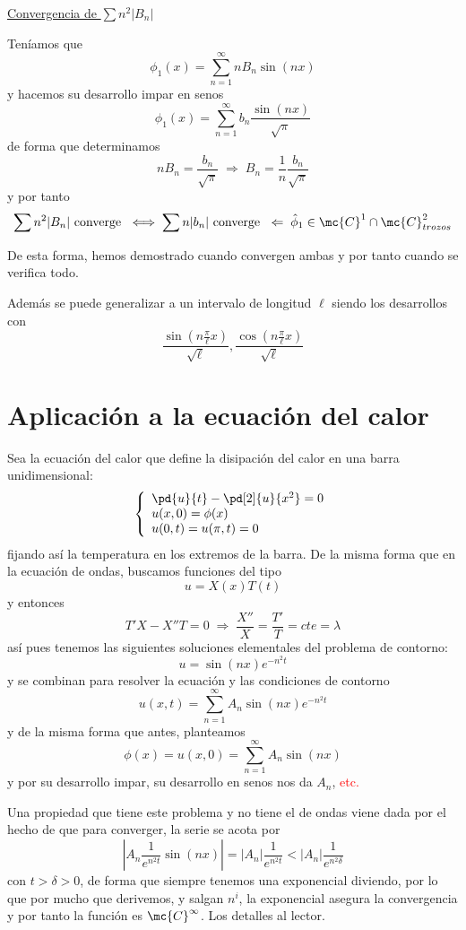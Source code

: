 \begin{eje}
     \underline{Convergencia de $\sum n^2 |B_n|$}

    Teníamos que
    $$\phi_1(x)=\sum_{n=1}^{\infty} n B_n \sin(nx)$$
    y hacemos su desarrollo impar en senos
    $$\hat{\phi}_1(x)=\sum_{n=1}^{\infty} b_n \dfrac{\sin(nx)}{\sqrt{\pi}}$$
    de forma que determinamos
    $$nB_n=\dfrac{b_n}{\sqrt{\pi}} \; \Rightarrow \; B_n =\dfrac{1}{n} \dfrac{b_n}{\sqrt{\pi}}$$
    y por tanto
    $$\sum n^2|B_n| \text{ converge } \iff \sum n |b_n| \text{ converge }\; \Leftarrow \; \hat{\phi}_1 \in \mc{C}^1 \cap \mc{C}^2_{trozos}$$

    De esta forma, hemos demostrado cuando convergen ambas y por tanto cuando se verifica todo.

    Además se puede generalizar a un intervalo de longitud $\ell$ siendo los desarrollos con
    $$\dfrac{\sin(n \frac{\pi}{\ell}x)}{\sqrt{\ell}}, \dfrac{\cos(n \frac{\pi}{\ell}x)}{\sqrt{\ell}}$$
    \end{eje}
    \section{Aplicación a la ecuación del calor}
    Sea la ecuación del calor que define la disipación del calor en una barra unidimensional:
    $$\left\{ \begin{array}{l}
         \pd{u}{t} - \pd[2]{u}{x^2}=0  \\
          u(x,0)=\phi(x) \\
          u(0,t)=u(\pi,t)=0
    \end{array} \right.$$
    fijando así la temperatura en los extremos de la barra. De la misma forma que en la ecuación de ondas, buscamos funciones del tipo
    $$u=X(x) T(t)$$
    y entonces
    $$T'X - X''T=0 \; \Rightarrow \; \dfrac{X''}{X}=\dfrac{T'}{T}=cte = \lambda $$
    así pues tenemos las siguientes soluciones elementales del problema de contorno:
    $$u=\sin(nx) e^{-n^2t}$$
    y se combinan para resolver la ecuación y las condiciones de contorno
    $$u(x,t)=\sum_{n=1}^{\infty} A_n \sin(nx) e^{-n^2t}$$
    y de la misma forma que antes, planteamos
    $$\phi(x)=u(x,0)=\sum_{n=1}^{\infty} A_n \sin(nx)$$
    y por su desarrollo impar, su desarrollo en senos nos da $A_n$, \textcolor{red}{etc.}

    Una propiedad que tiene este problema y no tiene el de ondas viene dada por el hecho de que para converger, la serie se acota por
    $$\left|A_n \dfrac{1}{e^{n^2t}}\sin(nx) \right|=|A_n| \dfrac{1}{e^{n^2t}} < |A_n| \dfrac{1}{e^{n^2 \delta}}$$
    con $t > \delta > 0$, de forma que siempre tenemos una exponencial diviendo, por lo que por mucho que derivemos, y salgan $n^i$, la exponencial asegura la convergencia y por tanto la función es $\mc{C}^{\infty}$. Los detalles al lector.

